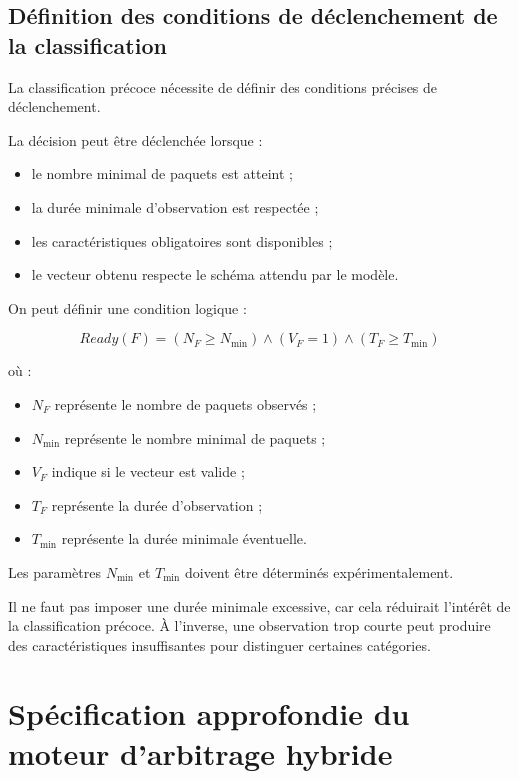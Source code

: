 \subsection{Définition des conditions de déclenchement de la classification}

La classification précoce nécessite de définir des conditions précises de déclenchement.

La décision peut être déclenchée lorsque :

\begin{itemize}
    \item le nombre minimal de paquets est atteint ;
    \item la durée minimale d'observation est respectée ;
    \item les caractéristiques obligatoires sont disponibles ;
    \item le vecteur obtenu respecte le schéma attendu par le modèle.
\end{itemize}

On peut définir une condition logique :

\[
Ready(F)=
(N_F\geq N_{\min})
\land
(V_F=1)
\land
(T_F\geq T_{\min})
\]

où :

\begin{itemize}
    \item $N_F$ représente le nombre de paquets observés ;
    \item $N_{\min}$ représente le nombre minimal de paquets ;
    \item $V_F$ indique si le vecteur est valide ;
    \item $T_F$ représente la durée d'observation ;
    \item $T_{\min}$ représente la durée minimale éventuelle.
\end{itemize}

Les paramètres $N_{\min}$ et $T_{\min}$ doivent être déterminés expérimentalement.

Il ne faut pas imposer une durée minimale excessive, car cela réduirait l'intérêt de la classification précoce. À l'inverse, une observation trop courte peut produire des caractéristiques insuffisantes pour distinguer certaines catégories.

\section{Spécification approfondie du moteur d'arbitrage hybride}

